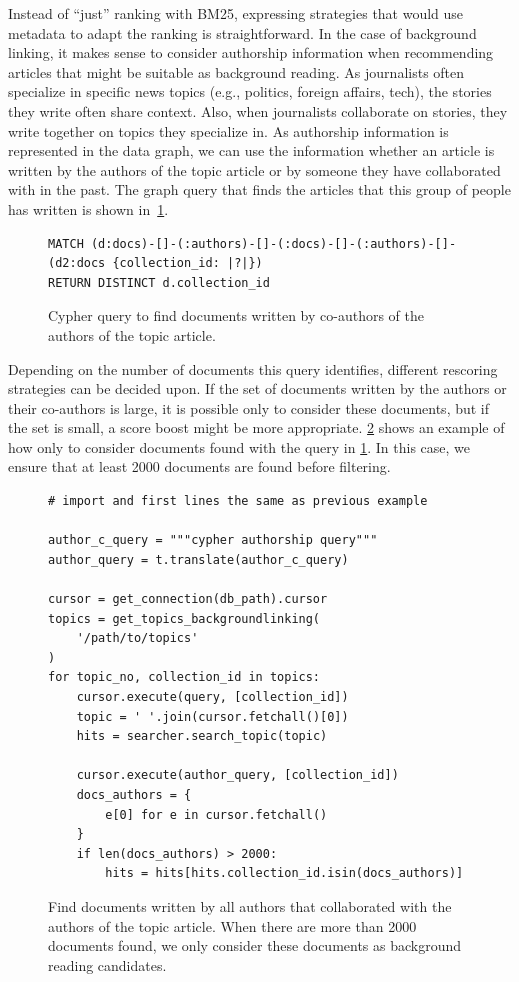 \noindent Instead of ``just'' ranking with BM25, expressing strategies that would use metadata to adapt the ranking is straightforward. In the case of background linking, it makes sense to consider authorship information when recommending articles that might be suitable as background reading. As journalists often specialize in specific news topics (e.g., politics, foreign affairs, tech), the stories they write often share context. Also, when journalists collaborate on stories, they write together on topics they specialize in. As authorship information is represented in the data graph, we can use the information whether an article is written by the authors of the topic article or by someone they have collaborated with in the past. The graph query that finds the articles that this group of people has written is shown in~\cref{fig:author-cypher}.

\begin{figure}
	\begin{verbatim}
MATCH (d:docs)-[]-(:authors)-[]-(:docs)-[]-(:authors)-[]-(d2:docs {collection_id: |?|}) 
RETURN DISTINCT d.collection_id
	\end{verbatim}
	\caption{Cypher query to find documents written by co-authors of the authors of the topic article.}
	\label{fig:author-cypher}
\end{figure}

\noindent Depending on the number of documents this query identifies, different rescoring strategies can be decided upon. If the set of documents written by the authors or their co-authors is large, it is possible only to consider these documents, but if the set is small, a score boost might be more appropriate. \cref{fig:authors-code} shows an example of how only to consider documents found with the query in \cref{fig:author-cypher}. In this case, we ensure that at least 2000 documents are found before filtering.

\begin{figure}
	\begin{verbatim}
# import and first lines the same as previous example

author_c_query = """cypher authorship query"""
author_query = t.translate(author_c_query)

cursor = get_connection(db_path).cursor
topics = get_topics_backgroundlinking(
    '/path/to/topics'
)
for topic_no, collection_id in topics:
    cursor.execute(query, [collection_id])
    topic = ' '.join(cursor.fetchall()[0])
    hits = searcher.search_topic(topic)

    cursor.execute(author_query, [collection_id])
    docs_authors = {
        e[0] for e in cursor.fetchall()
    }
    if len(docs_authors) > 2000:
        hits = hits[hits.collection_id.isin(docs_authors)]
	\end{verbatim}
	\caption{Find documents written by all authors that collaborated with the authors of the topic article. When there are more than 2000 documents found, we only consider these documents as background reading candidates.}
	\label{fig:authors-code}
\end{figure}

